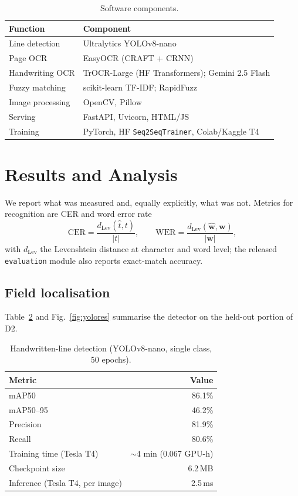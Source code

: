\documentclass[journal]{IEEEtran}
\begin{document}
\begin{table}[t]
\centering
\caption{Software components.}
\label{tab:stack}
\small
\begin{tabular}{ll}
\toprule
\textbf{Function} & \textbf{Component} \\
\midrule
Line detection & Ultralytics YOLOv8-nano \\
Page OCR & EasyOCR (CRAFT + CRNN) \\
Handwriting OCR & TrOCR-Large (HF Transformers); Gemini 2.5 Flash \\
Fuzzy matching & scikit-learn TF-IDF; RapidFuzz \\
Image processing & OpenCV, Pillow \\
Serving & FastAPI, Uvicorn, HTML/JS \\
Training & PyTorch, HF \texttt{Seq2SeqTrainer}, Colab/Kaggle T4 \\
\bottomrule
\end{tabular}
\end{table}

\section{Results and Analysis}\label{sec:results}
We report what was measured and, equally explicitly, what was not. Metrics for recognition are CER and word error rate
\begin{equation}
\mathrm{CER}=\frac{d_{\mathrm{Lev}}(\hat t,t)}{|t|},\qquad
\mathrm{WER}=\frac{d_{\mathrm{Lev}}(\hat{\mathbf w},\mathbf w)}{|\mathbf w|},
\end{equation}
with $d_{\mathrm{Lev}}$ the Levenshtein distance at character and word level; the released \texttt{evaluation} module also reports exact-match accuracy.

\subsection{Field localisation}
Table~\ref{tab:yolo} and Fig.~\ref{fig:yolores} summarise the detector on the held-out portion of D2.

\begin{table}[t]
\centering
\caption{Handwritten-line detection (YOLOv8-nano, single class, 50 epochs).}
\label{tab:yolo}
\begin{tabular}{lr}
\toprule
\textbf{Metric} & \textbf{Value} \\
\midrule
mAP50 & 86.1\% \\
mAP50--95 & 46.2\% \\
Precision & 81.9\% \\
Recall & 80.6\% \\
Training time (Tesla T4) & $\sim$4 min (0.067 GPU-h) \\
Checkpoint size & 6.2\,MB \\
Inference (Tesla T4, per image) & 2.5\,ms \\
\bottomrule
\end{tabular}
\end{table}
\end{document}
